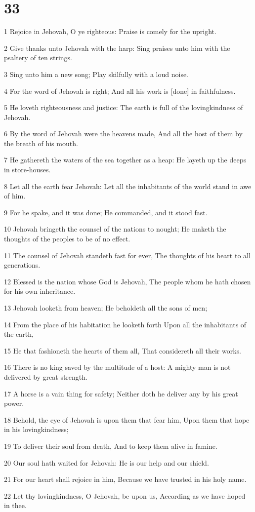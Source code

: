 \chapter{33}

\par 1 Rejoice in Jehovah, O ye righteous: Praise is comely for the upright.
\par 2 Give thanks unto Jehovah with the harp: Sing praises unto him with the psaltery of ten strings.
\par 3 Sing unto him a new song; Play skilfully with a loud noise.
\par 4 For the word of Jehovah is right; And all his work is [done] in faithfulness.
\par 5 He loveth righteousness and justice: The earth is full of the lovingkindness of Jehovah.
\par 6 By the word of Jehovah were the heavens made, And all the host of them by the breath of his mouth.
\par 7 He gathereth the waters of the sea together as a heap: He layeth up the deeps in store-houses.
\par 8 Let all the earth fear Jehovah: Let all the inhabitants of the world stand in awe of him.
\par 9 For he spake, and it was done; He commanded, and it stood fast.
\par 10 Jehovah bringeth the counsel of the nations to nought; He maketh the thoughts of the peoples to be of no effect.
\par 11 The counsel of Jehovah standeth fast for ever, The thoughts of his heart to all generations.
\par 12 Blessed is the nation whose God is Jehovah, The people whom he hath chosen for his own inheritance.
\par 13 Jehovah looketh from heaven; He beholdeth all the sons of men;
\par 14 From the place of his habitation he looketh forth Upon all the inhabitants of the earth,
\par 15 He that fashioneth the hearts of them all, That considereth all their works.
\par 16 There is no king saved by the multitude of a host: A mighty man is not delivered by great strength.
\par 17 A horse is a vain thing for safety; Neither doth he deliver any by his great power.
\par 18 Behold, the eye of Jehovah is upon them that fear him, Upon them that hope in his lovingkindness;
\par 19 To deliver their soul from death, And to keep them alive in famine.
\par 20 Our soul hath waited for Jehovah: He is our help and our shield.
\par 21 For our heart shall rejoice in him, Because we have trusted in his holy name.
\par 22 Let thy lovingkindness, O Jehovah, be upon us, According as we have hoped in thee.

